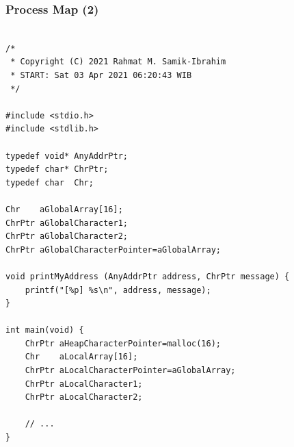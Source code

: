 \documentclass[aspectratio=169, xcolor=table, notheorems, hyperref={pdfpagelabels=false}]{beamer}
\begin{document}
\begin{frame}[fragile]
\frametitle{Process Map (2)}
\begin{lstlisting}[basicstyle=\ttfamily\tiny]         % 108

/*
 * Copyright (C) 2021 Rahmat M. Samik-Ibrahim
 * START: Sat 03 Apr 2021 06:20:43 WIB
 */

#include <stdio.h>
#include <stdlib.h>

typedef void* AnyAddrPtr;
typedef char* ChrPtr;
typedef char  Chr;

Chr    aGlobalArray[16];
ChrPtr aGlobalCharacter1;
ChrPtr aGlobalCharacter2;
ChrPtr aGlobalCharacterPointer=aGlobalArray;

void printMyAddress (AnyAddrPtr address, ChrPtr message) {
    printf("[%p] %s\n", address, message);
}

int main(void) {
    ChrPtr aHeapCharacterPointer=malloc(16);
    Chr    aLocalArray[16];
    ChrPtr aLocalCharacterPointer=aGlobalArray;
    ChrPtr aLocalCharacter1;
    ChrPtr aLocalCharacter2;

    // ...
}

\end{lstlisting}
\end{frame}
\end{document}
